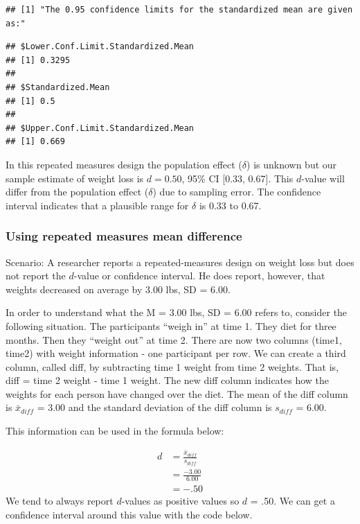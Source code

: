 \documentclass[
]{krantz}
\begin{document}
\begin{verbatim}
## [1] "The 0.95 confidence limits for the standardized mean are given as:"
\end{verbatim}

\begin{verbatim}
## $Lower.Conf.Limit.Standardized.Mean
## [1] 0.3295
## 
## $Standardized.Mean
## [1] 0.5
## 
## $Upper.Conf.Limit.Standardized.Mean
## [1] 0.669
\end{verbatim}

In this repeated measures design the population effect (\(\delta\)) is unknown but our sample estimate of weight loss is \(d = 0.50\), 95\% CI {[}0.33, 0.67{]}. This \(d\)-value will differ from the population effect (\(\delta\)) due to sampling error. The confidence interval indicates that a plausible range for \(\delta\) is 0.33 to 0.67.

\hypertarget{using-repeated-measures-mean-difference}{%
\subsubsection{Using repeated measures mean difference}\label{using-repeated-measures-mean-difference}}

Scenario: A researcher reports a repeated-measures design on weight loss but does not report the \(d\)-value or confidence interval. He does report, however, that weights decreased on average by 3.00 lbs, SD = 6.00.

In order to understand what the M = 3.00 lbs, SD = 6.00 refers to, consider the following situation. The participants ``weigh in'' at time 1. They diet for three months. Then they ``weight out'' at time 2. There are now two columns (time1, time2) with weight information - one participant per row. We can create a third column, called diff, by subtracting time 1 weight from time 2 weights. That is, diff = time 2 weight - time 1 weight. The new diff column indicates how the weights for each person have changed over the diet. The mean of the diff column is \(\bar{x}_{diff}\) = 3.00 and the standard deviation of the diff column is \(s_{diff}\) = 6.00.

This information can be used in the formula below:

\[
\begin{aligned}
d & = \frac{\bar{x}_{diff}}{s_{diff}}\\
&= \frac{-3.00}{6.00} \\
&= -.50
\end{aligned}
\]
We tend to always report \(d\)-values as positive values so \(d\) = .50. We can get a confidence interval around this value with the code below.
\end{document}
